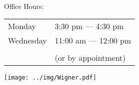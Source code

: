 \documentclass[12pt]{amsart}
\numberwithin{equation}{section}
\begin{document}
{}\ {}

\vspace{100pt}

  \begin{center}

  \huge

  \thispagestyle{empty}

  {\sc Office Hours:}

  \bigskip
  \bigskip
  \bigskip

  \begin{tabular}{ll}
  Monday &3:30 pm --- 4:30 pm\\
  Wednesday &11:00 am --- 12:00 pm\\\\
  \qquad\qquad\qquad\qquad\qquad&{(or by appointment)}
  \end{tabular}

  \vspace{80pt}

  \texttt{[image: ../img/Wigner.pdf]}





  \end{center}

  
\end{document}
